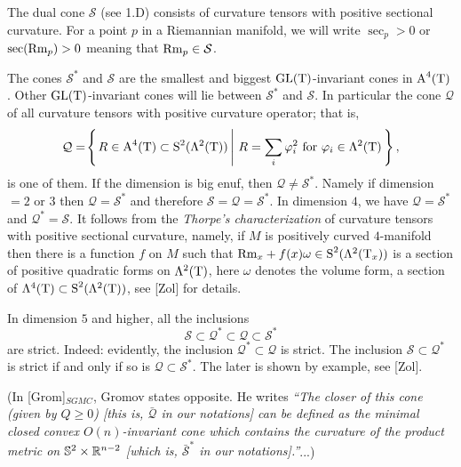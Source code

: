\documentclass{article}
\begin{document}
The dual cone $\mathcal{S}$ (see 1.D) consists of curvature tensors with
positive sectional curvature.
For a point $p$ in a Riemannian manifold,
we will write $\sec_p>0$ or $\mathop{\rm sec}\nolimits(\mathrm{Rm}_p)>0$ meaning
that $\mathrm{Rm}_p\in \mathcal{S}$.


The cones $\mathcal{S}^*$ and $\mathcal{S}$ are the smallest and biggest
$\mathrm{GL}(\text{\rm T})$-invariant cones in $\text{\rm A}^4(\text{\rm T})$. Other $\mathrm{GL}(\text{\rm T})$-invariant cones
will lie between $\mathcal{S}^*$ and $\mathcal{S}$.
In particular the cone $\mathcal{Q}$ of
all curvature tensors with positive curvature operator;
that is,
$$\mathcal{Q}=\set{R\in \A^4(\T)\i \S^2(\Lambda^2(\T))}{R=\sum_i\phi_i^2 \text{
for } \phi_i\in \Lambda^2(\T)},$$ is one of them.
If the dimension is big enuf, then $\mathcal{Q}\not=\mathcal{S}^*$.
Namely if dimension $=2$ or $3$
then $\mathcal{Q}=\mathcal{S}^*$ and therefore $\mathcal{S}=\mathcal{Q}=\mathcal{S}^*$.
In dimension $4$, we have $\mathcal{Q}=\mathcal{S}^*$ and
$\mathcal{Q}^*=\mathcal{S}$.
It follows from the \emph{Thorpe's characterization} of curvature tensors with positive
sectional curvature,  namely, if $M$ is positively curved
$4$-manifold then there is a function $f$ on $M$ such that
$\mathrm{Rm}_x+f(x)\omega\in \text{\rm S}^2(\Lambda^2(\text{\rm T}_x))$ is a section of positive
quadratic forms on $\Lambda^2(\text{\rm T})$, here $\omega$ denotes the
volume form, a section of $\Lambda^4(\text{\rm T})\subset \text{\rm S}^2(\Lambda^2(\text{\rm T}))$, see
[Zol] for details.

In dimension $5$ and higher, all the inclusions 
\[\mathcal{S}\subset \mathcal{Q}^*\subset\mathcal{Q}\subset\mathcal{S}^*\]
are strict.
Indeed: evidently, the inclusion $\mathcal{Q}^*\subset\mathcal{Q}$ is strict.
The inclusion $\mathcal{S}\subset \mathcal{Q}^*$ is strict if and only if so is
$\mathcal{Q}\subset\mathcal{S}^*$.
The later is shown by example, see
[Zol].

(In [Grom]$_{SGMC}$, Gromov states opposite. He writes \emph{ ``The closer of this cone (given by $Q\ge 0$) [this is, $\bar{\mathcal{Q}}$ in our notations] can be defined as the minimal
closed convex $O(n)$-invariant cone which contains the curvature
of the product metric on $\mathbb{S}^2\times \mathbb{R}^{n-2}$ [which is, $\bar
{\mathcal{S}}^*$ in our notations].''}...)

\
\end{document}

